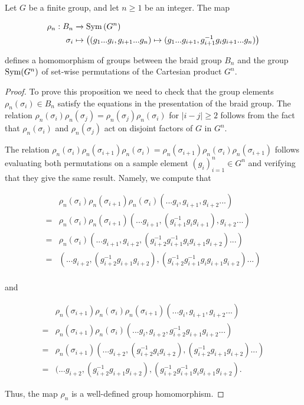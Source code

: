 \begin{proposition} Let $G$ be a finite group, and let $n\geq 1$ be an integer. The map

\begin{align*}
\rho_n: B_n &\xrightarrow{} \operatorname{Sym}\left(G^n\right)\\
\sigma_i &\mapsto \left((g_1... g_i, g_{i+1} ... g_n)\mapsto (g_1... g_{i+1}, g_{i+1}^{-1}g_i g_{i+1} ... g_n) \right)
\end{align*}

defines a homomorphism of groups between the braid group $B_n$ and the group $\operatorname{Sym}(G^n)$ of set-wise permutations of the Cartesian product $G^n$.
\end{proposition}
\begin{proof} To prove this proposition we need to check that the group elements $\rho_n(\sigma_i)\in B_n$ satisfy the equations in the presentation of the braid group. The relation $\rho_n(\sigma_i)\rho_n(\sigma_j)=\rho_n(\sigma_j)\rho_n(\sigma_i)$ for $|i-j|\geq 2$ follows from the fact that $\rho_n(\sigma_i)$ and $\rho_n(\sigma_j)$ act on disjoint factors of $G$ in $G^n$.

The relation $\rho_n(\sigma_i)\rho_n(\sigma_{i+1})\rho_n(\sigma_i)=\rho_n(\sigma_{i+1})\rho_n(\sigma_i)\rho_n(\sigma_{i+1})$ follows evaluating both permutations on a sample element $(g_{i})_{i=1}^{n}\in G^n$ and verifying that they give the same result. Namely, we compute that

\begin{align*}
&\rho_n(\sigma_i)\rho_n(\sigma_{i+1})\rho_n(\sigma_i)(... g_{i}, g_{i+1},g_{i+2}...)\\
=&\rho_n(\sigma_i)\rho_n(\sigma_{i+1})(... g_{i+1}, (g_{i+1}^{-1}g_{i}g_{i+1}),g_{i+2}...)\\
=&\rho_n(\sigma_i)(... g_{i+1},g_{i+2}, (g_{i+2}^{-1}g_{i+1}^{-1}g_{i}g_{i+1}g_{i+2})...)\\
=&(... g_{i+2},(g_{i+2}^{-1}g_{i+1}g_{i+2}), (g_{i+2}^{-1}g_{i+1}^{-1}g_{i}g_{i+1}g_{i+2})...)\\
\end{align*}

and 

\begin{align*}
&\rho_n(\sigma_{i+1})\rho_n(\sigma_{i})\rho_n(\sigma_{i+1})(... g_{i}, g_{i+1},g_{i+2}...)\\
=&\rho_n(\sigma_{i+1})\rho_n(\sigma_{i})(... g_{i}, g_{i+2},g_{i+2}^{-1}g_{i+1}g_{i+2}...)\\
=&\rho_n(\sigma_{i+1})(... g_{i+2}, (g_{i+2}^{-1}g_{i}g_{i+2}),(g_{i+2}^{-1}g_{i+1}g_{i+2})...)\\
=&(... g_{i+2}, (g_{i+2}^{-1}g_{i+1}g_{i+2}), (g_{i+2}^{-1}g^{-1}_{i+1}g_{i}g_{i+1}g_{i+2}).
\end{align*}

Thus, the map $\rho_n$ is a well-defined group homomorphism.
\end{proof}

